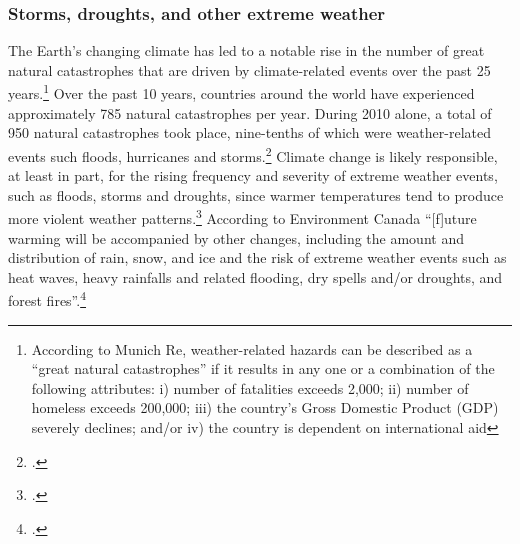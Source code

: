 	
	\subsubsection{Storms, droughts, and other extreme weather}



The Earth's changing climate has led to a notable rise in the number of great natural catastrophes that are driven by climate-related events over the past 25 years.\footnote{According to Munich Re, weather-related hazards can be described as a ``great natural catastrophes'' if it results in any one or a combination of the following attributes: i) number of fatalities exceeds 2,000; ii) number of homeless exceeds 200,000; iii) the country’s Gross Domestic Product (GDP) severely declines; and/or iv) the country is dependent on international aid}
Over the past 10 years, countries around the world have experienced approximately 785 natural catastrophes per year. 
During 2010 alone, a total of 950 natural catastrophes took place, nine-tenths of which were weather-related events such floods, hurricanes and storms.\footcite[][]{MunichRECatast}
Climate change is likely responsible, at least in part, for the rising frequency and severity of extreme weather events, such as floods, storms and droughts, since warmer temperatures tend to produce more violent weather patterns.\footcite[See: ][]{IPCCHurricane}
According to Environment Canada ``[f]uture warming will be accompanied by other changes, including the amount and distribution of rain, snow, and ice and the risk of extreme weather events such as heat waves, heavy rainfalls and related flooding, dry spells and/or droughts, and forest fires''.\footcite[][]{ECImpactsOfCC}



